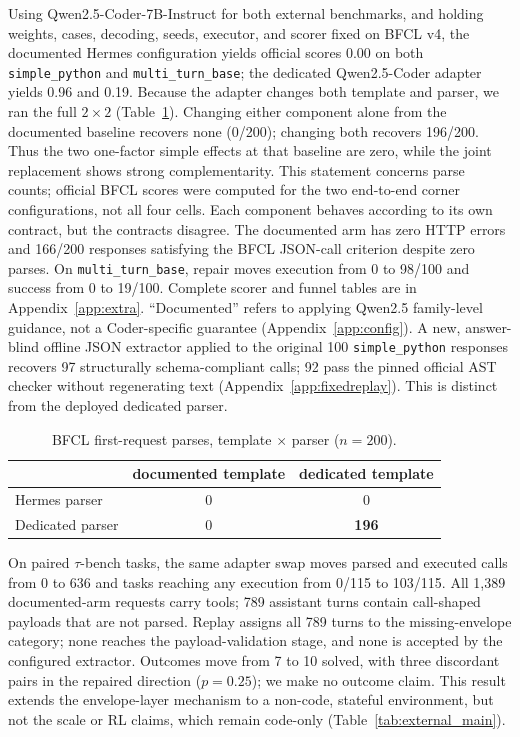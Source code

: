 Using Qwen2.5-Coder-7B-Instruct for both external benchmarks, and holding weights, cases,
decoding, seeds, executor, and scorer fixed on BFCL v4, the
documented Hermes configuration yields official scores 0.00 on both \texttt{simple\_python} and
\texttt{multi\_turn\_base}; the dedicated Qwen2.5-Coder adapter yields 0.96 and 0.19. Because the
adapter changes both template and parser, we ran the full $2\times2$ (Table~\ref{tab:bfcl2x2}).
Changing either component alone from the documented baseline recovers none (0/200); changing both
recovers 196/200. Thus the two one-factor simple effects at that baseline are zero, while the joint
replacement shows strong complementarity. This statement concerns parse counts; official BFCL
scores were computed for the two end-to-end corner configurations, not all four cells. Each
component behaves according to its own contract, but the contracts disagree. The documented arm has zero HTTP errors and
166/200 responses satisfying the BFCL JSON-call criterion despite zero parses. On \texttt{multi\_turn\_base}, repair moves execution from
0 to 98/100 and success from 0 to 19/100. Complete scorer and funnel tables are in
Appendix~\ref{app:extra}. ``Documented'' refers to applying Qwen2.5 family-level guidance,
not a Coder-specific guarantee (Appendix~\ref{app:config}). A new, answer-blind offline JSON
extractor applied to the original 100 \texttt{simple\_python} responses recovers 97 structurally
schema-compliant calls; 92 pass the pinned official AST checker without regenerating text
(Appendix~\ref{app:fixedreplay}). This is distinct from the deployed dedicated parser.

\begin{table}[H]
\caption{BFCL first-request parses, template $\times$ parser ($n=200$).}
\label{tab:bfcl2x2}
\centering
\small
\begin{tabular}{lcc}
\toprule
 & documented template & dedicated template \\
\midrule
Hermes parser & 0 & 0 \\
Dedicated parser & 0 & \textbf{196} \\
\bottomrule
\end{tabular}
\end{table}

On paired $\tau$-bench tasks, the same adapter swap moves parsed and executed calls from
0 to 636 and tasks reaching any execution from 0/115 to 103/115. All 1,389 documented-arm
requests carry tools; 789 assistant turns contain call-shaped payloads that are not parsed.
Replay assigns all 789 turns to the missing-envelope category; none reaches the
payload-validation stage, and none is accepted by the configured extractor. Outcomes move from 7 to 10 solved, with
three discordant pairs in the repaired direction ($p=0.25$); we make no outcome claim. This result
extends the envelope-layer mechanism to a non-code, stateful environment, but not the scale or RL
claims, which remain code-only (Table~\ref{tab:external_main}).

